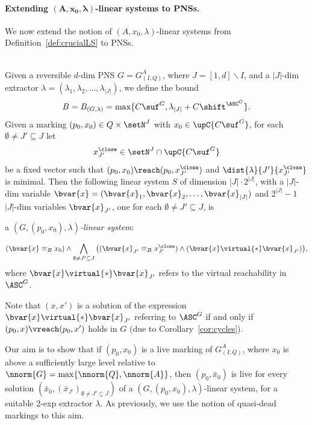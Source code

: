 \paragraph{Extending $\bm{(A,x_0,\lambda)}$-linear systems to PNSs.}
We now extend the notion of $(A,x_0,\lambda)$-linear systems
from Definition~\ref{def:crucialLS} to PNSs.

\begin{defi}\label{def:crucialLSPNS}
\hfill\\
	Given a reversible $d$-dim PNS	$G=G^A_{(I,Q)}$, where
	$J=[1,d]\smallsetminus I$, and a $|J|$-dim extractor
	$\lambda=(\lambda_1,\lambda_2,\dots,\lambda_{|J|})$,
	we define
the bound	\begin{equation}\label{eq:BPNS}
	B=B_{(G,\lambda)}=\max\{C\suf^G,\lambda_{|J|}+C\shift^{\ASC^G}\}.
	\end{equation}
	Given a marking $(p_0,x_0)\in Q\times \setN^J$ 
	with $x_0\in\upC{C\suf^G}$,
	for each $\emptyset\neq J'\subseteq J$ let 
	\[x^\close_{J'}\in \setN^J\cap\upC{C\suf^G}\]
	be a fixed vector such that
	$(p_0,x_0)\reach(p_0,x^\close_{J'})$ and  
	$\dist{\lambda}{J'}{x^\close_{J'}}$ is
	minimal. 
Then the following 
	linear system $S$ of dimension $|J|\cdot 2^{|J|}$, with
	a $|J|$-dim variable
	$\bvar{x}=(\bvar{x}_1,\bvar{x}_2,\dots,\bvar{x}_{|J|})$ and
	$2^{|J|}-1$ $|J|$-dim variables 
	$\bvar{x}_{J'}$, one for each $\emptyset\neq J'\subseteq J$,
	is 
	\begin{center}
		a \emph{$(G,(p_0,x_0),\lambda)$-linear system}:
	\end{center}		
\begin{equation}\label{eq:GxLS}
	(\bvar{x}\equiv_B x_0)
	\land
	\bigwedge_{\emptyset\neq J'\subseteq
	J}\big((\bvar{x}_{J'}\equiv_B x^\close_{J'})\land
	(\bvar{x}\virtual{*}\bvar{x}_{J'})\big),
\end{equation}
	where $\bvar{x}\virtual{*}\bvar{x}_{J'}$ refers to the virtual
	reachability in $\ASC^G$. 
\end{defi}	


\noindent
Note that $(x,x')$ is a solution of the expression
$\bvar{x}\virtual{*}\bvar{x}_{J'}$ referring to $\ASC^G$ if and
only if $(p_0,x)\vreach(p_0,x')$ holds in $G$ (due to Corollary~\ref{cor:cycles}).

Our aim is to show that if $(p_0,x_0)$ is a live marking of
$G^A_{(I,Q)}$, where $x_0$ is above a sufficiently large level
relative to $\nnorm{G}=\max\{\nnorm{Q},\nnorm{A}\}$, then  $(p_0,\bar{x}_0)$ is live for every
solution $(\bar{x}_0,(\bar{x}_{J'})_{\emptyset\neq J'\subseteq J})$
of a $(G,(p_0,x_0),\lambda)$-linear system, for a suitable 2-exp
extractor $\lambda$.
As previously, we use the notion of quasi-dead markings to this aim.


